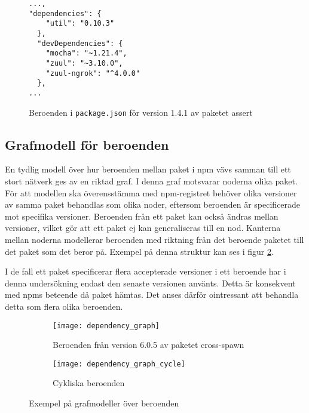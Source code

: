 \lstset{language=Java}
\begin{figure}[h]
  \center
  \begin{minipage}[c]{5cm}
    \begin{lstlisting}
...,
"dependencies": {
    "util": "0.10.3"
  },
  "devDependencies": {
    "mocha": "~1.21.4",
    "zuul": "~3.10.0",
    "zuul-ngrok": "^4.0.0"
  },
...
    \end{lstlisting}
  \end{minipage}
  \caption{Beroenden i \texttt{package.json} för version 1.4.1 av paketet assert\cite{npm-assert}}
  \label{fig:package.json}
\end{figure}

\subsection{Grafmodell för beroenden}
\label{subsec:joel_o-grafmodell}
En tydlig modell över hur beroenden mellan paket i npm vävs samman till ett stort nätverk ges av en riktad graf. I denna graf motsvarar noderna olika paket. För att modellen ska överensstämma med npm-registret behöver olika versioner av samma paket behandlas som olika noder, eftersom beroenden är specificerade mot specifika versioner. Beroenden från ett paket kan också ändras mellan versioner, vilket gör att ett paket ej kan generaliseras till en nod. Kanterna mellan noderna modellerar beroenden med riktning från det beroende paketet till det paket som det beror på. Exempel på denna struktur kan ses i figur \ref{fig:beroende-graf}.

I de fall ett paket specificerar flera accepterade versioner i ett beroende har i denna undersökning endast den senaste versionen använts. Detta är konsekvent med npms beteende då paket hämtas. Det anses därför ointressant att behandla detta som flera olika beroenden.

\begin{figure}
  \captionsetup{justification=centering}
  \centering
  \begin{subfigure}[t]{.5\textwidth}
    \begin{minipage}[t][8cm][b]{0,5\textwidth}
      \vspace*{\fill}
        \texttt{[image: dependency\_graph]}
      \vspace*{\fill}
    \end{minipage}
    \caption{Beroenden från version 6.0.5 av paketet cross-spawn}
    \label{fig:beroende-graf}
  \end{subfigure}%
  \begin{subfigure}[t]{.5\textwidth}
    \begin{minipage}[t][8cm][b]{0,5\textwidth}
      \vspace*{\fill}
      \texttt{[image: dependency\_graph\_cycle]}
      \vspace*{\fill}
    \end{minipage}
    \caption{Cykliska beroenden}
    \label{fig:beroende-graf-cykel}
  \end{subfigure}
  \caption{Exempel på grafmodeller över beroenden}
  \label{fig:grafmodell}
\end{figure}

